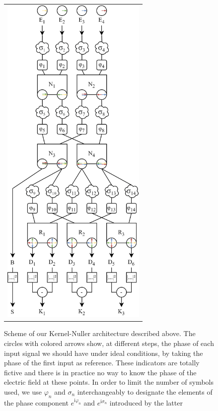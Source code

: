 \documentclass{aa}
\newcommand{\mi}{\mathrm{i}}
\begin{document}
        \begin{figure}
            \begin{center}
            \begin{tabular}{c}
            \includegraphics[width=7cm]{img/scheme.png}
            \end{tabular}
            \end{center}
            \caption[Architecture] 
            { \label{fig:architecture} 
            Scheme of our Kernel-Nuller architecture described above. The circles with colored arrows show, at different steps, the phase of each input signal we should have under ideal conditions, by taking the phase of the first input as reference. These indicators are totally fictive and there is in practice no way to know the phase of the electric field at these points. In order to limit the number of symbols used, we use $\varphi_n$ and $\sigma_n$ interchangeably to designate the elements of the phase component $e^{\mi\varphi_n}$ and $e^{\mi\sigma_n}$ introduced by the latter}
        \end{figure}
        
\end{document}
